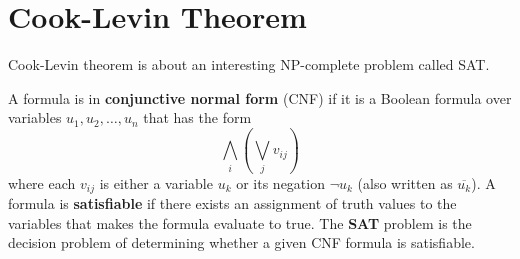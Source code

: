 \section{Cook-Levin Theorem}

Cook-Levin theorem is about an interesting NP-complete problem called SAT.

\begin{definition}
	A formula is in \textbf{conjunctive normal form} (CNF) if it is a Boolean formula over variables $u_1, u_2, \ldots, u_n$ that has the form
	\[ \bigwedge_i\left( \bigvee_j v_{ij}\right)\]
	where each $v_{ij}$ is either a variable $u_k$ or its negation $\neg u_k$ (also written as $\overline{u_k}$). A formula is \textbf{satisfiable} if there exists an assignment of truth values to the variables that makes the formula evaluate to true. The \textbf{SAT} problem is the decision problem of determining whether a given CNF formula is satisfiable.
\end{definition}

